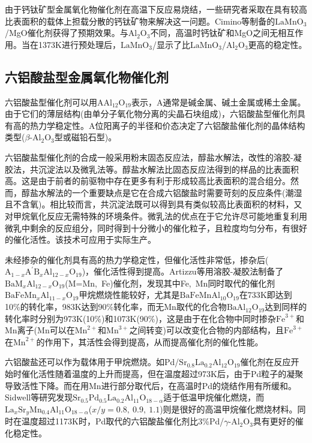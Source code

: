 由于钙钛矿型金属氧化物催化剂在高温下反应易烧结，一些研究者采取在具有较高比表面积的载体上担载分散的钙钛矿物来解决这一问题。\textrm{Cimino}等\cite{CataD59-19_2000}制备的$\mathrm{LaMnO}_3$/\textrm{MgO}催化剂获得了预期效果。与$\mathrm{Al}_2\mathrm{O}_3$不同，高温时钙钛矿和\textrm{MgO}之间无相互作用。当在1373\textrm{K}进行预处理后，$\mathrm{LaMnO}_3$/显示了比$\mathrm{LaMnO}_3$/$\mathrm{Al}_2\mathrm{O}_3$更高的稳定性。

\subsection{六铝酸盐型金属氧化物催化剂}
六铝酸盐型催化剂可以用$\mathrm{AAl}_{12}\mathrm{O}_{19}$表示，\textrm{A}通常是碱金属、碱土金属或稀土金属。由于它们的薄层结构(由单分子氧化物分离的尖晶石块组成)，六铝酸盐型催化剂具有高的热力学稳定性。\textrm{A}位阳离子的半径和价态决定了六铝酸盐催化剂的晶体结构类型($\beta$-$\mathrm{Al}_2\mathrm{O}_3$型或磁铅石型)。

六铝酸盐型催化剂的合成一般采用粉末固态反应法，醇盐水解法，改性的溶胶-凝胶法，共沉淀法以及微乳法\cite{ACA265-207_2004}等。醇盐水解法比固态反应法得到的样品的比表面积高。这是由于前者的前驱物中存在更多有利于形成较高比表面积的混合组分。然而，醇盐水解法的一个重要缺点是它在合成六铝酸盐时需要苛刻的反应条件(潮湿且不含氧)。相比较而言，共沉淀法既可以得到具有类似较高比表面积的材料，又对甲烷氧化反应无需特殊的环境条件。微乳法的优点在于它允许尽可能地重复利用微乳中剩余的反应组分，同时得到十分微小的催化粒子，且粒度均匀分布，有很好的催化活性。该技术可应用于实际生产。

未经掺杂的催化剂具有高的热力学稳定性，但催化活性非常低，掺杂后($\mathrm{A}_{1-x}\mathrm{A}^{\prime}\mathrm{B}_x\mathrm{Al}_{12-x}\mathrm{O}_{19}$)，催化活性得到提高\cite{CataD59-163_2000,MSEA384-324_2004}。Artizzu等\cite{CataD59-163_2000}用溶胶-凝胶法制备了$\mathrm{BaM}_x\mathrm{Al}_{12-x}\mathrm{O}_{19}$(\textrm{M=Mn,~Fe})催化剂，发现其中\textrm{Fe,~Mn}同时取代的催化剂$\mathrm{BaFeMn}_x\mathrm{Al}_{11-x}\mathrm{O}_{19}$甲烷燃烧性能较好，尤其是$\mathrm{BaFeMnAl}_{10}\mathrm{O}_{19}$在733\textrm{K}即达到10\%的转化率，983\textrm{K}达到90\%转化率，而无\textrm{Mn}取代的化合物$\mathrm{BaAl}_{12}\mathrm{O}_{19}$达到同样的转化率时分别为973\textrm{K}(10\%)和1073\textrm{K}(90\%)，这是由于在化合物中同时掺杂$\textrm{Fe}^{3+}$和\textrm{Mn}离子(\textrm{Mn}可以在$\mathrm{Mn}^{2+}$和$\mathrm{Mn}^{3+}$之间转变)可以改变化合物的内部结构，且$\mathrm{Fe}^{3+}$在$\mathrm{Mn}^{2+}$的作用下，其活性会得到提高，从而提高催化剂的催化性能。

六铝酸盐还可以作为载体用于甲烷燃烧。如\textrm{Pd}/$\mathrm{Sr}_{0.8}\mathrm{La}_{0.2}\mathrm{Al}_{12}\mathrm{O}_{19}$催化剂\cite{JMCA186-135_2002}在反应开始时催化活性随着温度的上升而提高，但在温度超过973\textrm{K}后，由于\textrm{Pd}粒子的凝聚导致活性下降。而在用\textrm{Mn}进行部分取代后，在高温时\textrm{Pd}的烧结作用有所缓和。\textrm{Sidwell}\cite{ACA255-279_2003}等研究发现$\mathrm{Sr}_{0.5}\mathrm{Pd}_{0.5}\mathrm{La}_{0.2}\mathrm{Al}_{11}\mathrm{O}_{18-\alpha}$适于低温甲烷催化燃烧，而$\mathrm{La}_x\mathrm{Sr}_y\mathrm{Mn}_{0.4}\mathrm{Al}_{11}\mathrm{O}_{18-\alpha}$($x/y=0.8,~0.9,~1.1$)则是很好的高温甲烷催化燃烧材料。同时在温度超过1173\textrm{K}时，\textrm{Pd}取代的六铝酸盐催化剂比3\%\textrm{Pd}/$\gamma$-$\mathrm{Al}_2\mathrm{O}_3$具有更好的催化稳定性。

